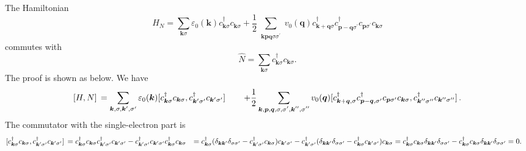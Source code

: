\documentclass[hyperref, a4paper]{article}
\def\\{}%
\begin{document}
The Hamiltonian 
\begin{equation}
    H_N=\sum_{\mathbf{k} \sigma} \varepsilon_0(\mathbf{k}) c_{\mathbf{k} \sigma}^{\dagger} c_{\mathbf{k} \sigma}+\frac{1}{2} \sum_{\substack{\mathbf{k p q} \\ \sigma \sigma^{\prime}}} v_0(\mathbf{q}) c_{\mathbf{k}+\mathbf{q} \sigma}^{\dagger} c_{\mathbf{p}-\mathbf{q} \sigma^{\prime}}^{\dagger} c_{\mathbf{p} \sigma^{\prime}} c_{\mathbf{k} \sigma}
    \label{eq:general-ham}
\end{equation}
commutes with 
\begin{equation}
    \widehat{N}=\sum_{\mathbf{k} \sigma} c_{\mathbf{k} \sigma}^{\dagger} c_{\mathbf{k} \sigma}.
\end{equation}
The proof is shown as below.
We have 
\[
    \begin{aligned}
        \comm*{H}{N} &= \sum_{\vb*{k}, \sigma, \vb*{k}', \sigma'}
        \varepsilon_0(\vb*{k})
        \comm*{c^\dagger_{\vb*{k} \sigma} c_{\vb*{k} \sigma}}{c^\dagger_{\vb*{k}' \sigma'} c_{\vb*{k}' \sigma'}} \\
        &\quad + \frac{1}{2} \sum_{\substack{\vb*{k}, \vb*{p}, \vb*{q}, \sigma, \\ \sigma', \vb*{k}'', \sigma''}}
        v_0(\vb*{q}) \comm*{
            c^\dagger_{\vb*{k} + \vb*{q}, \sigma} c^\dagger_{\vb*{p} - \vb*{q}, \sigma'}
            c_{\vb*{p} \sigma'} c_{\vb*{k} \sigma}
        }{c^\dagger_{\vb*{k}'' \sigma''} c_{\vb*{k}'' \sigma''}}.
    \end{aligned}
\]
The commutator with the single-electron part is 
\[
    \begin{aligned}
        \comm*{c^\dagger_{\vb*{k} \sigma} c_{\vb*{k} \sigma}}{c^\dagger_{\vb*{k}' \sigma'} c_{\vb*{k}' \sigma'}}
        &= c^\dagger_{\vb*{k} \sigma} c_{\vb*{k} \sigma} c^\dagger_{\vb*{k}' \sigma'} c_{\vb*{k}' \sigma'}
        - c^\dagger_{\vb*{k}' \sigma'} c_{\vb*{k}' \sigma'} c^\dagger_{\vb*{k} \sigma} c_{\vb*{k} \sigma} \\
        &= c^\dagger_{\vb*{k} \sigma} (\delta_{\vb*{k} \vb*{k}'} \delta_{\sigma \sigma'} - c^\dagger_{\vb*{k}' \sigma'} c_{\vb*{k} \sigma}) c_{\vb*{k}' \sigma'}
        - c^\dagger_{\vb*{k}' \sigma'} (\delta_{\vb*{k} \vb*{k}'} \delta_{\sigma \sigma'} - c^\dagger_{\vb*{k} \sigma} c_{\vb*{k}' \sigma'}) c_{\vb*{k} \sigma} \\
        &= c^\dagger_{\vb*{k} \sigma} c_{\vb*{k} \sigma} \delta_{\vb*{k} \vb*{k}'} \delta_{\sigma \sigma'}
        - c^\dagger_{\vb*{k} \sigma} c_{\vb*{k} \sigma} \delta_{\vb*{k} \vb*{k}'} \delta_{\sigma \sigma'}
        = 0.
    \end{aligned}
\]
\end{document}
